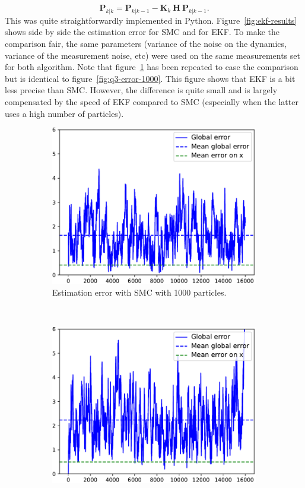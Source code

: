 \documentclass[english, DIV=13]{scrartcl}
\renewcommand{\vec}[1]{\mathbf{#1}}
\begin{document}
\[ \vec{P}_{k|k} = \vec{P}_{k|k-1} - \vec{K}_k ~ \vec{H} ~ \vec{P}_{k|k-1}. \]
This was quite straightforwardly implemented in Python.
Figure~\ref{fig:ekf-results} shows side by side the estimation error for SMC and for EKF.
To make the comparison fair, the same parameters (variance of the noise on the dynamics,
variance of the measurement noise, etc) were used on the same measurements set for both
algorithm. Note that figure~\ref{fig:smc-error-1000} has been repeated to ease the
comparison but is identical to figure~\ref{fig:q3-error-1000}. This figure shows that
EKF is a bit less precise than SMC. However, the difference is quite small and is largely
compensated by the speed of EKF compared to SMC (especially when the latter uses a
high number of particles).

\begin{figure}
    \centering
    \begin{subfigure}{0.49\textwidth}
        \includegraphics[width=\textwidth]{figures/error-1000}
        \caption{Estimation error with SMC with 1000 particles.}
        \label{fig:smc-error-1000}
    \end{subfigure}%
    ~
    \begin{subfigure}{0.49\textwidth}
        \includegraphics[width=\textwidth]{figures/ekf-error}

\end{subfigure}
\end{figure}
\end{document}
